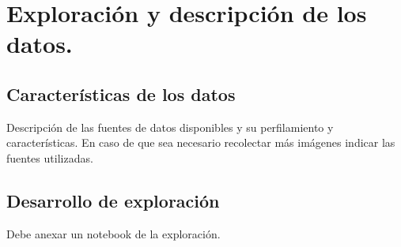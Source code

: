 \section{Exploración y descripción de los datos.}

\subsection{Características de los datos} 
Descripción de las fuentes de datos disponibles y su perfilamiento y características. En caso de que sea necesario recolectar más imágenes indicar las fuentes utilizadas.

\subsection{Desarrollo de exploración}
Debe anexar un notebook de la exploración.